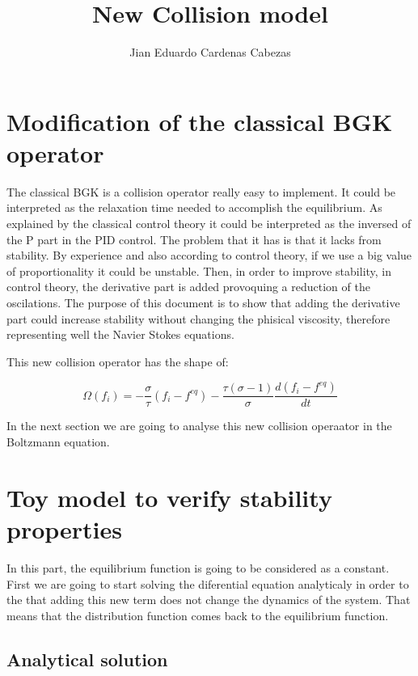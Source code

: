 \documentclass{article}
\title{\textbf{New Collision model}}
\author{Jian Eduardo Cardenas Cabezas}
\begin{document}
\maketitle

\section{Modification of the classical BGK operator}
The classical BGK is a collision operator really easy to implement. It could be interpreted as the relaxation time needed to accomplish the equilibrium.
As explained by the classical control theory it could be interpreted as the inversed of the P part in the PID control. The problem that it has is that it lacks from stability.
By experience and also according to control theory, if we use a big value of proportionality it could be unstable. Then, in order to improve stability, in control theory,
the derivative part is added provoquing a reduction of the oscilations. 
The purpose of this document is to show that adding the derivative part could increase stability without changing the phisical viscosity, therefore representing well the
Navier Stokes equations.

This new collision operator has the shape of:

\begin{equation}
    \Omega(f_i) = -\frac{\sigma}{\tau}(f_i-f^{eq}) - \frac{\tau(\sigma-1)}{\sigma}\frac{d(f_i-f^{eq})}{dt}    
\end{equation}

In the next section we are going to analyse this new collision operaator in the Boltzmann equation.


\section{Toy model to verify stability properties}

In this part, the equilibrium function is going to be considered as a constant.
First we are going to start solving the diferential equation analyticaly in order to the that adding this new term does not change the dynamics of the system.
That means that the distribution function comes back to the equilibrium function.

\subsection{Analytical solution}
\end{document}
